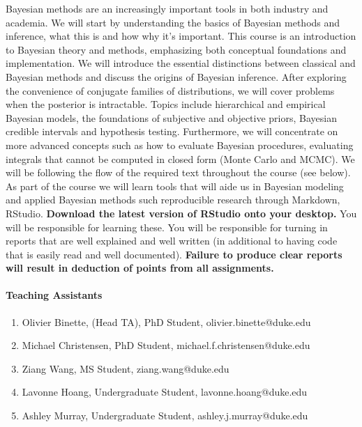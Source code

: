 \documentclass[11pt]{article}
\begin{document}
\vspace*{1em}

Bayesian methods are an increasingly important tools
in both industry and academia. We will start by understanding the basics of Bayesian methods and inference, what this is and how why it's important. This course is an introduction to Bayesian theory and methods, emphasizing both conceptual foundations and implementation. We will introduce the essential distinctions between classical and Bayesian methods and discuss the origins of Bayesian inference. After exploring the convenience of conjugate families of distributions, we will cover problems when the posterior is intractable. Topics include hierarchical and empirical Bayesian models, the foundations of subjective and objective priors, Bayesian credible intervals and hypothesis testing. Furthermore, we 
will  concentrate on more advanced concepts such as how to evaluate Bayesian procedures, evaluating integrals that cannot be computed in closed form (Monte Carlo and MCMC). We will be following the flow of the required text throughout the course (see below). \\

As part of the course we will learn tools that will aide us in Bayesian modeling and applied Bayesian methods such reproducible research through Markdown, RStudio. \textbf{Download the latest version of RStudio onto your desktop.} You will be responsible for learning these. You will be responsible for turning in reports that are well explained and well written (in additional to having code that is easily read and well documented). \textbf{Failure to produce clear reports will result in deduction of points from all assignments.} 
\\

\newpage
\paragraph{Teaching Assistants}

\begin{enumerate}
\item Olivier Binette, (Head TA), PhD Student, olivier.binette@duke.edu
\item Michael Christensen, PhD Student, michael.f.christensen@duke.edu
\item Ziang Wang, MS Student, ziang.wang@duke.edu
\item Lavonne Hoang, Undergraduate Student, lavonne.hoang@duke.edu
\item Ashley Murray, Undergraduate Student, ashley.j.murray@duke.edu
\end{enumerate}
\end{document}
